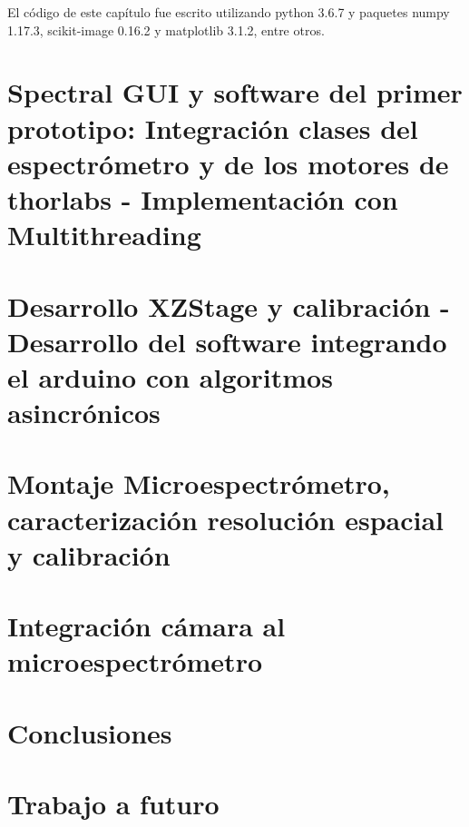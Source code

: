 \documentclass{ctuthesis}
\begin{document}
El código de este capítulo fue escrito utilizando python 3.6.7 y paquetes numpy 1.17.3, scikit-image 0.16.2 y matplotlib 3.1.2, entre otros.





\vspace{1cm}
\vspace{1cm}

\chapter{Spectral GUI y software del primer prototipo: Integración clases del espectrómetro y de los motores de thorlabs - Implementación con Multithreading}

\chapter{Desarrollo XZStage y calibración - Desarrollo del software integrando el arduino con algoritmos asincrónicos}

\chapter{Montaje Microespectrómetro, caracterización resolución espacial y calibración}{}

\chapter{Integración cámara al microespectrómetro}



\chapter{Conclusiones}

\chapter{Trabajo a futuro}

\renewcommand\bibname{Referencias Bibliográficas}


\end{document}
